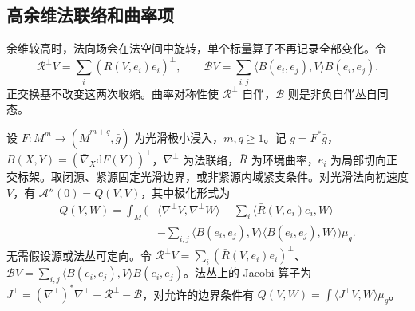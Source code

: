 \subsection{高余维法联络和曲率项}
\label{g3:subsec:1901:04}
余维较高时，法向场会在法空间中旋转，单个标量算子不再记录全部变化。令
\[
	\mathcal R^\perp V=\sum_i(\bar R(V,e_i)e_i)^\perp,
	\qquad \mathcal B V=\sum_{i,j}\langle B(e_i,e_j),V\rangle B(e_i,e_j).
\]
正交换基不改变这两次收缩。曲率对称性使 \(\mathcal R^\perp\) 自伴，\(\mathcal B\) 则是非负自伴丛自同态。

\begin{theorem}[极小浸入的第二变分]\label{g3:thm:minimal-area-second-variation}
	设 \(F:M^m\to(\bar M^{m+q},\bar g)\) 为光滑极小浸入，\(m,q\ge1\)。记 \(g=F^*\bar g\)，\(B(X,Y)=(\bar\nabla_X\mathrm dF(Y))^\perp\)，\(\nabla^\perp\) 为法联络，\(\bar R\) 为环境曲率，\(e_i\) 为局部切向正交标架。取闭源、紧源固定光滑边界，或非紧源内域紧支条件。对光滑法向初速度 \(V\)，有 \(\mathcal A''(0)=Q(V,V)\)，其中极化形式为
	\begin{equation}\label{g3:eq:minimal-normal-index-form}
	\begin{aligned}
		Q(V,W)=\int_M\bigg(&\langle\nabla^\perp V,\nabla^\perp W\rangle
		-\sum_i\langle\bar R(V,e_i)e_i,W\rangle\\
		&-\sum_{i,j}\langle B(e_i,e_j),V\rangle
		\langle B(e_i,e_j),W\rangle\bigg)\mu_g.
	\end{aligned}
	\end{equation}
	无需假设源或法丛可定向。令 \(\mathcal R^\perp V=\sum_i(\bar R(V,e_i)e_i)^\perp\)、\(\mathcal BV=\sum_{i,j}\langle B(e_i,e_j),V\rangle B(e_i,e_j)\)。法丛上的 Jacobi 算子为
	\(J^\perp=(\nabla^\perp)^*\nabla^\perp-\mathcal R^\perp-\mathcal B\)，对允许的边界条件有 \(Q(V,W)=\int\langle J^\perp V,W\rangle\mu_g\)。
\end{theorem}
